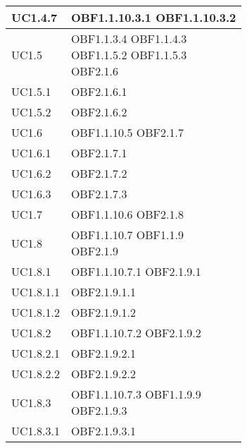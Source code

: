\documentclass{scalatekids-article}
\begin{document}
\begin{longtable}[H]{|p{5.5cm}|p{5.5cm}|}
  \hline
  UC1.4.7 & \multiLineCell[t]{OBF1.1.10.3.1 OBF1.1.10.3.2\\}\\
  \hline
  UC1.5 & \multiLineCell[t]{OBF1.1.3.4 OBF1.1.4.3\\OBF1.1.5.2 OBF1.1.5.3\\OBF2.1.6}\\
  \hline
  UC1.5.1 & \multiLineCell[t]{OBF2.1.6.1\\}\\
  \hline
  UC1.5.2 & \multiLineCell[t]{OBF2.1.6.2\\}\\
  \hline
  UC1.6 & \multiLineCell[t]{OBF1.1.10.5 OBF2.1.7\\}\\
  \hline
  UC1.6.1 & \multiLineCell[t]{OBF2.1.7.1\\}\\
  \hline
  UC1.6.2 & \multiLineCell[t]{OBF2.1.7.2\\}\\
  \hline
  UC1.6.3 & \multiLineCell[t]{OBF2.1.7.3\\}\\
  \hline
  UC1.7 & \multiLineCell[t]{OBF1.1.10.6 OBF2.1.8\\}\\
  \hline
  UC1.8 & \multiLineCell[t]{OBF1.1.10.7 OBF1.1.9\\OBF2.1.9}\\
  \hline
  UC1.8.1 & \multiLineCell[t]{OBF1.1.10.7.1 OBF2.1.9.1\\}\\
  \hline
  UC1.8.1.1 & \multiLineCell[t]{OBF2.1.9.1.1\\}\\
  \hline
  UC1.8.1.2 & \multiLineCell[t]{OBF2.1.9.1.2\\}\\
  \hline
  UC1.8.2 & \multiLineCell[t]{OBF1.1.10.7.2 OBF2.1.9.2\\}\\
  \hline
  UC1.8.2.1 & \multiLineCell[t]{OBF2.1.9.2.1\\}\\
  \hline
  UC1.8.2.2 & \multiLineCell[t]{OBF2.1.9.2.2\\}\\
  \hline
  UC1.8.3 & \multiLineCell[t]{OBF1.1.10.7.3 OBF1.1.9.9\\OBF2.1.9.3}\\
  \hline
  UC1.8.3.1 & \multiLineCell[t]{OBF2.1.9.3.1\\}\\

\end{longtable}
\end{document}
